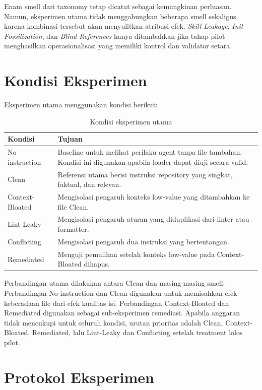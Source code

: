 Enam smell dari taxonomy tetap dicatat sebagai kemungkinan perluasan. Namun, eksperimen utama tidak menggabungkan beberapa smell sekaligus karena kombinasi tersebut akan menyulitkan atribusi efek. \textit{Skill Leakage}, \textit{Init Fossilization}, dan \textit{Blind References} hanya ditambahkan jika tahap pilot menghasilkan operasionalisasi yang memiliki kontrol dan validator setara.

\section{Kondisi Eksperimen}

Eksperimen utama menggunakan kondisi berikut:

\begin{table}[htbp]
\centering
\small
\renewcommand{\arraystretch}{1.25}
\caption{Kondisi eksperimen utama}
\label{tab:conditions}
\begin{tabularx}{\textwidth}{p{3.5cm}Y}
\toprule
\textbf{Kondisi} & \textbf{Tujuan} \\
\midrule
No instruction & Baseline untuk melihat perilaku agent tanpa file tambahan. Kondisi ini digunakan apabila loader dapat diuji secara valid. \\
Clean & Referensi utama berisi instruksi repository yang singkat, faktual, dan relevan. \\
Context-Bloated & Mengisolasi pengaruh konteks low-value yang ditambahkan ke file Clean. \\
Lint-Leaky & Mengisolasi pengaruh aturan yang diduplikasi dari linter atau formatter. \\
Conflicting & Mengisolasi pengaruh dua instruksi yang bertentangan. \\
Remediated & Menguji pemulihan setelah konteks low-value pada Context-Bloated dihapus. \\
\bottomrule
\end{tabularx}
\end{table}

Perbandingan utama dilakukan antara Clean dan masing-masing smell. Perbandingan No instruction dan Clean digunakan untuk memisahkan efek keberadaan file dari efek kualitas isi. Perbandingan Context-Bloated dan Remediated digunakan sebagai sub-eksperimen remediasi. Apabila anggaran tidak mencukupi untuk seluruh kondisi, urutan prioritas adalah Clean, Context-Bloated, Remediated, lalu Lint-Leaky dan Conflicting setelah treatment lolos pilot.

\section{Protokol Eksperimen}

